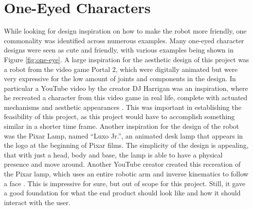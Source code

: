 \section{One-Eyed Characters}
While looking for design inspiration on how to make the robot more friendly, one commonality was identified across numerous examples. Many one-eyed character designs were seen as cute and friendly, with various examples being shown in Figure \ref{fig:one-eye}. A large inspiration for the aesthetic design of this project was a robot from the video game Portal 2, which were digitally animated but were very expressive for the low amount of joints and components in the design. In particular a YouTube video by the creator DJ Harrigan was an inspiration, where he recreated a character from this video game in real life, complete with actuated mechanisms and aesthetic appearances \cite{harriganPortalWheatleyReal2022}. This was important in establishing the feasibility of this project, as this project would have to accomplish something similar in a shorter time frame. Another inspiration for the design of the robot was the Pixar Lamp, named ``Luxo Jr.'', an animated desk lamp that appears in the logo at the beginning of Pixar films. The simplicity of the design is appealing, that with just a head, body and base, the lamp is able to have a physical presence and move around. Another YouTube creator created this recreation of the Pixar lamp, which uses an entire robotic arm and inverse kinematics to follow a face \cite{terranovaThisAdorableRobotic2015}. This is impressive for sure, but out of scope for this project. Still, it gave a good foundation for what the end product should look like and how it should interact with the user.

